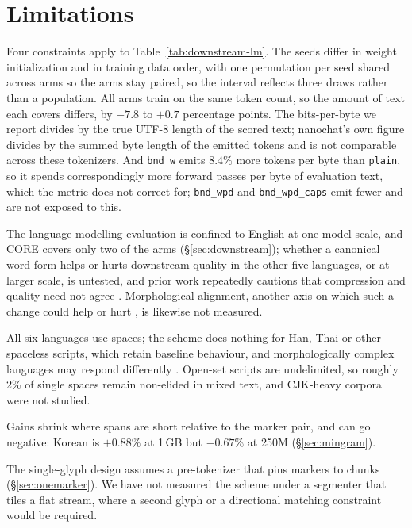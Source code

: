 \documentclass[11pt]{article}
\newcommand{\bnd}[1]{\texttt{bnd\_#1}}
\begin{document}
\section{Limitations}
\label{sec:limitations}

Four constraints apply to Table~\ref{tab:downstream-lm}. The seeds differ in weight
initialization and in training data order, with one permutation per seed shared across arms
so the arms stay paired, so the interval reflects three draws rather than a population. All arms train on
the same token count, so the amount of text each covers differs, by $-7.8$ to $+0.7$
percentage points. The bits-per-byte we report divides by the true UTF-8 length of the scored
text; nanochat's own figure divides by the summed byte length of the emitted tokens and is not
comparable across these tokenizers. And \bnd{w} emits $8.4\%$ more tokens per byte than
\texttt{plain}, so it spends correspondingly more forward passes per byte of evaluation text,
which the metric does not correct for; \bnd{wpd} and \bnd{wpd\_caps} emit fewer and are not
exposed to this.

The language-modelling evaluation is confined to English at one model scale, and CORE covers
only two of the arms (\S\ref{sec:downstream}); whether a canonical word form helps or hurts
downstream quality in the other five languages, or at larger scale, is untested, and prior
work repeatedly cautions that compression and quality need not agree
\citep{rust-etal-2021-good,zouhar-etal-2023-tokenization,cognetta-etal-2024-two,ali-etal-2024-tokenizer,lotz-etal-2025-beyond}.
Morphological alignment, another axis on which such a change could help or hurt
\citep{bostrom-durrett-2020-byte,arnett2025evaluatingmorphologicalalignmenttokenizers}, is
likewise not measured.

All six languages use spaces; the scheme does nothing for Han, Thai or other spaceless
scripts, which retain baseline behaviour, and morphologically complex languages may respond
differently \citep{arnett-bergen-2025-language,vemula-etal-2025-rethinking}. Open-set
scripts are undelimited, so roughly 2\% of single spaces remain non-elided in mixed text,
and CJK-heavy corpora were not studied.

Gains shrink where spans are short relative to the marker pair, and can go negative: Korean
is $+0.88\%$ at 1\,GB but $-0.67\%$ at 250M (\S\ref{sec:mingram}).

The single-glyph design assumes a pre-tokenizer that pins markers to chunks
(\S\ref{sec:onemarker}). We have not measured the scheme under a segmenter that tiles a flat
stream, where a second glyph or a directional matching constraint would be required.
\end{document}
